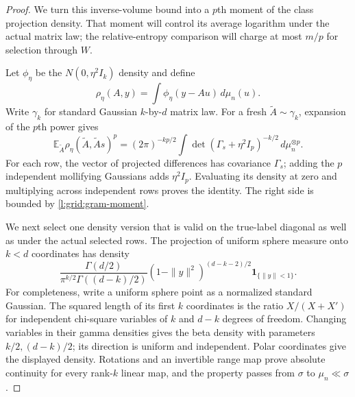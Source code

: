 \begin{proof}
We turn this inverse-volume bound into a $p$th moment of the class
projection density.  That moment will control its average logarithm
under the actual matrix law; the relative-entropy comparison will charge
at most $m/p$ for selection through $W$.

Let $\phi_\eta$ be the $N(0,\eta^2I_k)$ density and define
\[
 \rho_\eta(A,y)=\int\phi_\eta(y-Au)\,d\mu_n(u).
\]
Write $\gamma_k$ for standard Gaussian $k$-by-$d$ matrix law.  For a
fresh $\widetilde A\sim\gamma_k$, expansion of the $p$th power gives
\begin{equation}\label{l:grid:mollified-moment}
 \mathbb E_{\widetilde A}
       \rho_\eta(\widetilde A,\widetilde A s)^p
 =(2\pi)^{-kp/2}\int
       \det(\Gamma_s+\eta^2I_p)^{-k/2}\,d\mu_n^{\otimes p}.
\end{equation}
For each row, the vector of projected differences has covariance
$\Gamma_s$; adding the $p$ independent mollifying Gaussians adds
$\eta^2I_p$.  Evaluating its density at zero and multiplying across
independent rows proves the identity.  The right side is bounded by
\eqref{l:grid:gram-moment}.

We next select one density version that is valid on the true-label
diagonal as well as under the actual selected rows.  The projection of
uniform sphere measure onto $k<d$ coordinates has density
\[
 \frac{\Gamma(d/2)}{\pi^{k/2}\Gamma((d-k)/2)}
 (1-\|y\|^2)^{(d-k-2)/2}\mathbf1_{\{\|y\|<1\}}.
\]
For completeness, write a uniform sphere point as a normalized standard
Gaussian.  The squared length of its first $k$ coordinates is the ratio
$X/(X+X')$ for independent chi-square variables of $k$ and $d-k$
degrees of freedom.  Changing variables in their gamma densities gives
the beta density with parameters $k/2,(d-k)/2$; its direction is uniform
and independent.  Polar coordinates give the displayed density.
Rotations and an invertible range map prove absolute continuity for
every rank-$k$ linear map, and the property passes from $\sigma$ to
$\mu_n\ll\sigma$.


\end{proof}

